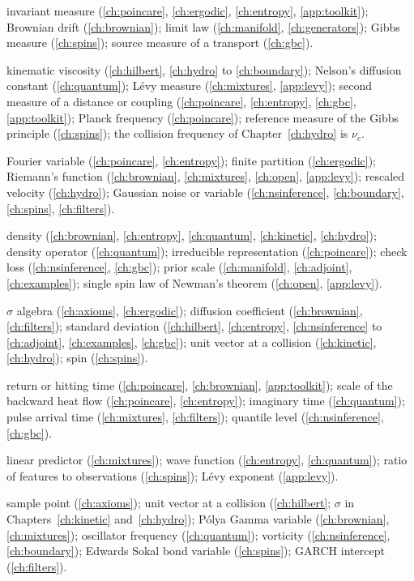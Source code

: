 \begin{description}[leftmargin=2.2em,labelwidth=1.8em,labelsep=0.4em,itemsep=0pt,parsep=0pt]
\item[$\mu$] invariant measure (\ref{ch:poincare}, \ref{ch:ergodic}, \ref{ch:entropy}, \ref{app:toolkit}); Brownian drift (\ref{ch:brownian}); limit law (\ref{ch:manifold}, \ref{ch:generators}); Gibbs measure (\ref{ch:spins}); source measure of a transport (\ref{ch:gbc}).
\item[$\nu$] kinematic viscosity (\ref{ch:hilbert}, \ref{ch:hydro} to \ref{ch:boundary}); Nelson's diffusion constant (\ref{ch:quantum}); L\'evy measure (\ref{ch:mixtures}, \ref{app:levy}); second measure of a distance or coupling (\ref{ch:poincare}, \ref{ch:entropy}, \ref{ch:gbc}, \ref{app:toolkit}); Planck frequency (\ref{ch:poincare}); reference measure of the Gibbs principle (\ref{ch:spins}); the collision frequency of Chapter~\ref{ch:hydro} is $\nu_c$.
\item[$\xi$] Fourier variable (\ref{ch:poincare}, \ref{ch:entropy}); finite partition (\ref{ch:ergodic}); Riemann's function (\ref{ch:brownian}, \ref{ch:mixtures}, \ref{ch:open}, \ref{app:levy}); rescaled velocity (\ref{ch:hydro}); Gaussian noise or variable (\ref{ch:nsinference}, \ref{ch:boundary}, \ref{ch:spins}, \ref{ch:filters}).
\item[$\rho$] density (\ref{ch:brownian}, \ref{ch:entropy}, \ref{ch:quantum}, \ref{ch:kinetic}, \ref{ch:hydro}); density operator (\ref{ch:quantum}); irreducible representation (\ref{ch:poincare}); check loss (\ref{ch:nsinference}, \ref{ch:gbc}); prior scale (\ref{ch:manifold}, \ref{ch:adjoint}, \ref{ch:examples}); single spin law of Newman's theorem (\ref{ch:open}, \ref{app:levy}).
\item[$\sigma$] $\sigma$ algebra (\ref{ch:axioms}, \ref{ch:ergodic}); diffusion coefficient (\ref{ch:brownian}, \ref{ch:filters}); standard deviation (\ref{ch:hilbert}, \ref{ch:entropy}, \ref{ch:nsinference} to \ref{ch:adjoint}, \ref{ch:examples}, \ref{ch:gbc}); unit vector at a collision (\ref{ch:kinetic}, \ref{ch:hydro}); spin (\ref{ch:spins}).
\item[$\tau$] return or hitting time (\ref{ch:poincare}, \ref{ch:brownian}, \ref{app:toolkit}); scale of the backward heat flow (\ref{ch:poincare}, \ref{ch:entropy}); imaginary time (\ref{ch:quantum}); pulse arrival time (\ref{ch:mixtures}, \ref{ch:filters}); quantile level (\ref{ch:nsinference}, \ref{ch:gbc}).
\item[$\psi$] linear predictor (\ref{ch:mixtures}); wave function (\ref{ch:entropy}, \ref{ch:quantum}); ratio of features to observations (\ref{ch:spins}); L\'evy exponent (\ref{app:levy}).
\item[$\omega$] sample point (\ref{ch:axioms}); unit vector at a collision (\ref{ch:hilbert}; $\sigma$ in Chapters~\ref{ch:kinetic} and~\ref{ch:hydro}); P\'olya Gamma variable (\ref{ch:brownian}, \ref{ch:mixtures}); oscillator frequency (\ref{ch:quantum}); vorticity (\ref{ch:nsinference}, \ref{ch:boundary}); Edwards Sokal bond variable (\ref{ch:spins}); GARCH intercept (\ref{ch:filters}).

\end{description}
